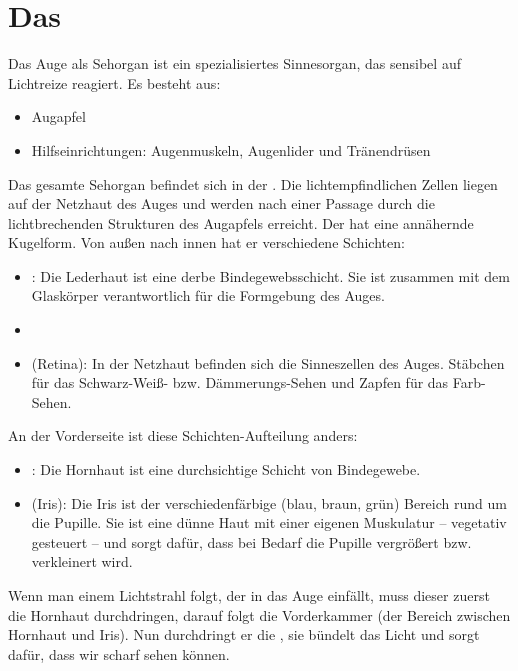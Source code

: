  
 
\clearpage %
\section{Das }
\label{topic:auge} 

\TextSlide{\TxBeschreibung}
{%
Das Auge als Sehorgan ist ein spezialisiertes Sinnesorgan,
das sensibel auf Lichtreize reagiert. Es besteht aus:

\begin{itemize}
  \item Augapfel
  \item Hilfseinrichtungen: Augenmuskeln, Augenlider und
  Tränendrüsen
\end{itemize} 

Das gesamte Sehorgan befindet sich in der . Die
lichtempfindlichen Zellen liegen auf der Netzhaut des Auges
und werden nach einer Passage durch die lichtbrechenden
Strukturen des Augapfels erreicht.
Der  hat eine annähernde Kugelform. Von außen nach
innen hat er verschiedene Schichten:

\begin{itemize}
  \item {} : Die Lederhaut ist eine
  derbe Bindegewebsschicht. Sie ist zusammen mit dem
  Glaskörper verantwortlich für die Formgebung des Auges.
  \item {}
  \item {} (Retina): In der Netzhaut befinden sich
  die Sinneszellen des Auges. Stäbchen für das Schwarz-Weiß-
  bzw. Dämmerungs-Sehen und Zapfen für das
  Farb-Sehen.
\end{itemize}
An der Vorderseite ist diese Schichten-Aufteilung anders:
\begin{itemize}
  \item {} : Die Hornhaut ist eine
  durchsichtige Schicht von Bindegewebe. 
  \item {} (Iris): Die Iris ist der
  verschiedenfärbige (blau, braun, grün) Bereich rund um die
  Pupille. Sie ist eine dünne Haut mit einer eigenen
  Muskulatur -- vegetativ gesteuert -- und sorgt dafür, dass
  bei Bedarf die Pupille vergrößert bzw. verkleinert wird.
\end{itemize}

Wenn man einem Lichtstrahl folgt, der in das Auge einfällt,
muss dieser zuerst die Hornhaut durchdringen, darauf folgt
die Vorderkammer (der Bereich zwischen Hornhaut und Iris).
Nun durchdringt er die , sie bündelt das Licht und
sorgt dafür, dass wir scharf sehen können.

}
